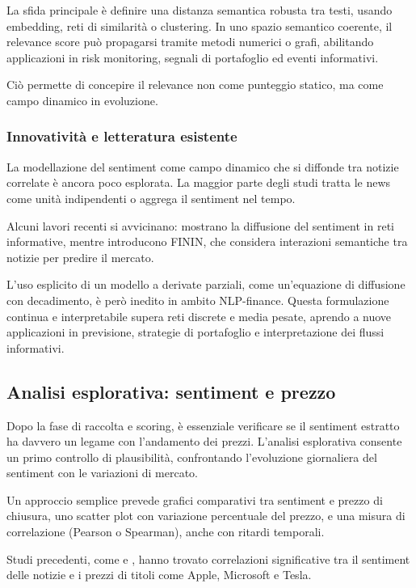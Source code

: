 \documentclass[a4paper,12pt]{article}
\begin{document}
La sfida principale è definire una distanza semantica robusta tra testi, usando embedding, reti di similarità o clustering. In uno spazio semantico coerente, il relevance score può propagarsi tramite metodi numerici o grafi, abilitando applicazioni in risk monitoring, segnali di portafoglio ed eventi informativi.

Ciò permette di concepire il relevance non come punteggio statico, ma come campo dinamico in evoluzione.


\subsubsection{Innovatività e letteratura esistente}

La modellazione del sentiment come campo dinamico che si diffonde tra notizie correlate è ancora poco esplorata. La maggior parte degli studi tratta le news come unità indipendenti o aggrega il sentiment nel tempo.

Alcuni lavori recenti si avvicinano: \textcite{wan2021sentimentdiffusion} mostrano la diffusione del sentiment in reti informative, mentre \textcite{wang2024finin} introducono FININ, che considera interazioni semantiche tra notizie per predire il mercato.

L’uso esplicito di un modello a derivate parziali, come un’equazione di diffusione con decadimento, è però inedito in ambito NLP-finance. Questa formulazione continua e interpretabile supera reti discrete e media pesate, aprendo a nuove applicazioni in previsione, strategie di portafoglio e interpretazione dei flussi informativi.
\newpage 
\subsection{Analisi esplorativa: sentiment e prezzo}

Dopo la fase di raccolta e scoring, è essenziale verificare se il sentiment estratto ha davvero un legame con l’andamento dei prezzi. L’analisi esplorativa consente un primo controllo di plausibilità, confrontando l'evoluzione giornaliera del sentiment con le variazioni di mercato.

Un approccio semplice prevede grafici comparativi tra sentiment e prezzo di chiusura, uno scatter plot con variazione percentuale del prezzo, e una misura di correlazione (Pearson o Spearman), anche con ritardi temporali.

Studi precedenti, come \textcite{turn0search0} e \textcite{turn0search1}, hanno trovato correlazioni significative tra il sentiment delle notizie e i prezzi di titoli come Apple, Microsoft e Tesla.
\end{document}
